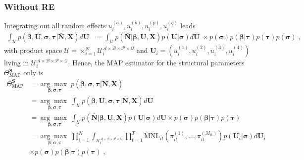 \documentclass[a4paper,12pt]{scrartcl} %
\begin{document}
\subsubsection{Without RE}
Integrating out all random effects $u_i^{(a)},u_i^{(b)},u_i^{(p)},u_i^{(q)}$ leads
\begin{align*}
\int_{\mathcal{U}}p\left(\boldsymbol{\beta},\boldsymbol{U},\boldsymbol{\sigma},\boldsymbol{\tau}|\bar{\boldsymbol{N}},\boldsymbol{X}\right)d\boldsymbol{U}
&=
\int_{\mathcal{U}}
p\left(\bar{\boldsymbol{N}}|\boldsymbol{\beta},\boldsymbol{U},\boldsymbol{X}\right)
p\left(\boldsymbol{U}|\boldsymbol{\sigma}\right)d\boldsymbol{U}\; \times 
p(\boldsymbol{\sigma})p\left(\boldsymbol{\beta}|\boldsymbol{\tau}\right)p(\boldsymbol{\tau})
p(\boldsymbol{\sigma})\;,
\end{align*}
with product space $\mathcal{U}=\times_{i=1}^N \mathcal{U}_i^{\mathcal{A}\times \mathcal{B}\times \mathcal{P}\times \mathcal{Q}}$ and  $\boldsymbol{U}_i=\left(u_i^{(1)},u_i^{(2)},
u_i^{(3)},u_i^{(4)}\right)$ living in $ \mathcal{U}_i^{\mathcal{A}\times \mathcal{B}\times \mathcal{P}\times \mathcal{Q}}$.
Hence, the MAP estimator for the structural parameters $\Theta_{\text{MAP}}^{\textbf{S}}$ only is
\begin{align*}
\Theta_{\text{MAP}}^{\textbf{S}}
&=
\underset{\boldsymbol{\beta},\boldsymbol{\sigma},\boldsymbol{\tau}}{\arg\max \;}
p\left(\boldsymbol{\beta},\boldsymbol{\sigma},\boldsymbol{\tau}|\bar{\boldsymbol{N}},\boldsymbol{X}\right)\\
&=
\underset{\boldsymbol{\beta},\boldsymbol{\sigma},\boldsymbol{\tau}}{\arg\max \;}
\int_{\mathcal{U}}
p\left(\boldsymbol{\beta},\boldsymbol{U},\boldsymbol{\sigma},\boldsymbol{\tau}|\bar{\boldsymbol{N}},\boldsymbol{X}\right)d\boldsymbol{U} \\
&=
\underset{\boldsymbol{\beta},\boldsymbol{\sigma},\boldsymbol{\tau}}{\arg\max \;}
\int_{\mathcal{U}}
p\left(\bar{\boldsymbol{N}}|\boldsymbol{\beta},\boldsymbol{U},\boldsymbol{X}\right)
p\left(\boldsymbol{U}|\boldsymbol{\sigma}\right)d\boldsymbol{U}
\times
p(\boldsymbol{\sigma})p\left(\boldsymbol{\beta}|\boldsymbol{\tau}\right)p(\boldsymbol{\tau})\;\\
&=
\underset{\boldsymbol{\beta},\boldsymbol{\sigma},\boldsymbol{\tau}}{\arg\max \;}
\prod_{i=1}^N 
\int_{\mathcal{U}_i^{\mathcal{A}\times \mathcal{B}\times \mathcal{P}\times \mathcal{Q}}} 
\prod_{t=1}^T
\text{MNL}_{it}\left(\pi_{it}^{(1)},\ldots,\pi_{it}^{(M_{it})}\right)
p\left(\boldsymbol{U}_i|\boldsymbol{\sigma}\right)d\boldsymbol{U}_i\\
&\times
p(\boldsymbol{\sigma})p\left(\boldsymbol{\beta}|\boldsymbol{\tau}\right)p(\boldsymbol{\tau})\;,
\end{align*}
\end{document}
